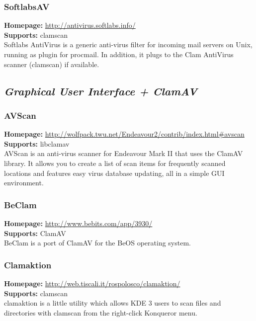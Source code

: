 \documentclass[a4paper,titlepage,12pt]{article}
\begin{document}
    \subsubsection{SoftlabsAV}
    \textbf{Homepage:} \url{http://antivirus.softlabs.info/}\\
    \textbf{Supports:} clamscan\\[4pt]
    Softlabs AntiVirus is a generic anti-virus filter for incoming mail
    servers on Unix, running as plugin for procmail. In addition, it plugs
    to the Clam AntiVirus scanner (clamscan) if available.

    \subsection{\emph{Graphical User Interface + ClamAV}}

    \subsubsection{AVScan}
    \textbf{Homepage:} \url{http://wolfpack.twu.net/Endeavour2/contrib/index.html#avscan}\\
    \textbf{Supports:} libclamav\\[4pt]
    AVScan is an anti-virus scanner for Endeavour Mark II that uses the ClamAV
    library. It allows you to create a list of scan items for frequently
    scanned locations and features easy virus database updating, all in
    a simple GUI environment.

    \subsubsection{BeClam}
    \textbf{Homepage:} \url{http://www.bebits.com/app/3930/}\\
    \textbf{Supports:} ClamAV\\[4pt]
    BeClam is a port of ClamAV for the BeOS operating system.

    \subsubsection{Clamaktion}
    \textbf{Homepage:} \url{http://web.tiscali.it/rospolosco/clamaktion/}\\
    \textbf{Supports:} clamscan\\[4pt]
    clamaktion is a little utility which allows KDE 3 users to scan files
    and directories with clamscan from the right-click Konqueror menu.
\end{document}
